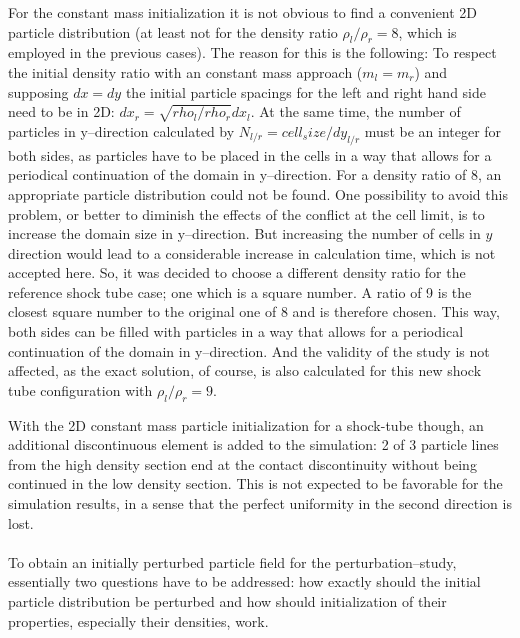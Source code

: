 \documentclass{report}
\begin{document}
For the constant mass initialization it is not obvious to find a convenient 2D particle distribution (at least not for the density ratio $\rho_l/\rho_r=8$, which is employed in the previous cases). The reason for this is the following:
To respect the initial density ratio with an constant mass approach ($m_l=m_r$) and supposing $dx=dy$ the initial particle spacings for the left and right hand side need to be in 2D: $dx_r=\sqrt{rho_l/rho_r} dx_l$.
At the same time, the number of particles in y--direction calculated by $N_{l/r}=\mathit{cell_size}/dy_{l/r}$ must 
be an integer for both sides, as particles have to be placed in the cells in a way that allows for a periodical continuation of the domain in y--direction.
For a density ratio of 8, an appropriate particle distribution could not be found. One possibility to avoid this problem, or better to diminish the effects of the conflict at the cell limit, is to increase the domain size in y--direction. But increasing the number of cells in $y$ direction would lead to a considerable increase in calculation time, which is not accepted here. So, it was decided to choose a different density ratio for the reference shock tube case; one which is a square number. A ratio of 9 is the closest square number to the original one of 8 and is therefore chosen.
This way, both sides can be filled with particles in a way that allows for a periodical continuation of the domain in y--direction. And the validity of the study is not affected, as the exact solution, of course, is also calculated for this new shock tube configuration with $\rho_l/\rho_r=9$. 

With the 2D constant mass particle initialization for a shock-tube though, an additional discontinuous element is added to the simulation: 2 of 3 particle lines from the high density section end at the contact discontinuity without being continued in the low density section. This is not expected to be favorable for the simulation results, in a sense that the perfect uniformity in the second direction is lost.\\
\\
\indent                                                                                                                                                                                                                                                                                                                                                                   
 To obtain an initially perturbed particle field for the perturbation--study, essentially two questions have to be addressed: how exactly should the initial particle distribution be perturbed and how should initialization of their properties, especially their densities, work.         
                                                                                                                                              
\end{document}
